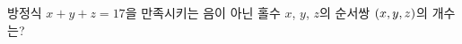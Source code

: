 방정식 $x+y+z=17$을 만족시키는 음이 아닌 홀수 $x$, $y$, $z$의 순서쌍 $(x{,}\mkern3mu\mathopen{}y{,}\mkern3mu\mathopen{}z)$의 개수는?
